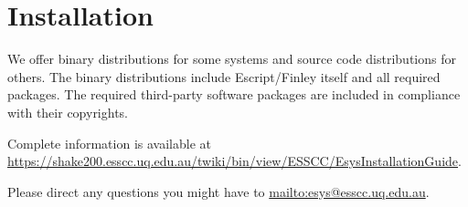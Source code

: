 
%
%
%


\chapter{Installation}
\label{INSTALL}

We offer binary distributions for some systems and source code distributions for others.
The binary distributions include Escript/Finley itself and all required packages.
The required third-party software packages are included in compliance with their copyrights.

Complete information is available at
\url{https://shake200.esscc.uq.edu.au/twiki/bin/view/ESSCC/EsysInstallationGuide}.

Please direct any questions you might have to \url{mailto:esys@esscc.uq.edu.au}.

